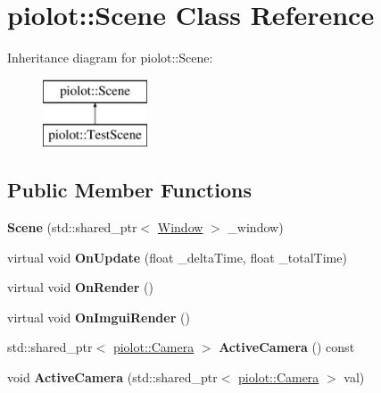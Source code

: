 \hypertarget{classpiolot_1_1_scene}{}\section{piolot\+:\+:Scene Class Reference}
\label{classpiolot_1_1_scene}
Inheritance diagram for piolot\+:\+:Scene\+:\begin{figure}[H]
\begin{center}
\leavevmode
\includegraphics[height=2.000000cm]{classpiolot_1_1_scene}
\end{center}
\end{figure}
\subsection*{Public Member Functions}
\begin{DoxyCompactItemize}
\item 
\mbox{\label{classpiolot_1_1_scene_af42469b97e0c1006bec5d384223db148}} 
{\bfseries Scene} (std\+::shared\+\_\+ptr$<$ \mbox{\hyperlink{class_window}{Window}} $>$ \+\_\+window)
\item 
\mbox{\label{classpiolot_1_1_scene_ae05b812e9f1caa80526a79a03ab456e1}} 
virtual void {\bfseries On\+Update} (float \+\_\+delta\+Time, float \+\_\+total\+Time)
\item 
\mbox{\label{classpiolot_1_1_scene_a6d634dd8b2f281052f034740644c1aa3}} 
virtual void {\bfseries On\+Render} ()
\item 
\mbox{\label{classpiolot_1_1_scene_aedea470f1c3485d76ef0681e4a503584}} 
virtual void {\bfseries On\+Imgui\+Render} ()
\item 
\mbox{\label{classpiolot_1_1_scene_a73af83e23a36087989538d25216bb1f8}} 
std\+::shared\+\_\+ptr$<$ \mbox{\hyperlink{classpiolot_1_1_camera}{piolot\+::\+Camera}} $>$ {\bfseries Active\+Camera} () const
\item 
\mbox{\label{classpiolot_1_1_scene_a2edd824436ee0c877ee03573c90f3002}} 
void {\bfseries Active\+Camera} (std\+::shared\+\_\+ptr$<$ \mbox{\hyperlink{classpiolot_1_1_camera}{piolot\+::\+Camera}} $>$ val)
\end{DoxyCompactItemize}
